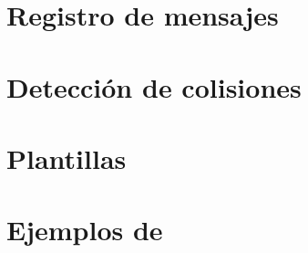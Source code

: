 \section{Registro de mensajes}
\label{labelmensajes}


\section{Detección de colisiones}
\label{labelcolisiones}


\section{Plantillas}
\label{labelplantillas}


\section{Ejemplos de }


